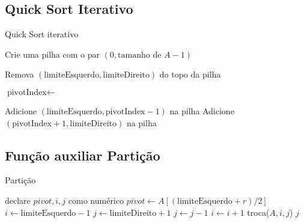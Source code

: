 \subsection{Quick Sort Iterativo}

\begin{algorithm}
	\caption{Quick Sort iterativo}
	\label{algo:iterative_quick_sort}
	\begin{algorithmic}[1]
		\Statex

		\State \Return
		\EndIf
		\State Crie uma pilha com o par $(0, \text{tamanho de } A - 1)$

		\State Remova $(\text{limiteEsquerdo}, \text{limiteDireito})$ do topo da pilha

		\State $\text{pivotIndex} \gets$ 

		\State Adicione $(\text{limiteEsquerdo}, \text{pivotIndex} - 1)$ na pilha 
		\EndIf
		\State Adicione $(\text{pivotIndex} + 1, \text{limiteDireito})$ na pilha 
		\EndIf
		\EndWhile
		\EndFunction
	\end{algorithmic}
\end{algorithm}
\FloatBarrier

\newpage
\subsection{Função auxiliar Partição}

\begin{algorithm}
	\caption{Partição}
	\label{algo:particao}
	\begin{algorithmic}[1]
		\State declare $pivot, i, j$ como numérico
		\State $pivot \gets A[(\text{limiteEsquerdo} + r) / 2]$
		\State $i \gets \text{limiteEsquerdo}- 1$
		\State $j \gets \text{limiteDireito} + 1$
		\Repeat
		\State $j \gets j - 1$
		\Repeat
		\State $i \gets i + 1$
		\State troca($A, i, j$)
		\EndIf
		\EndWhile
		\State \Return $j$
		\EndFunction
		\Statex
	\end{algorithmic}
\end{algorithm}
\FloatBarrier

